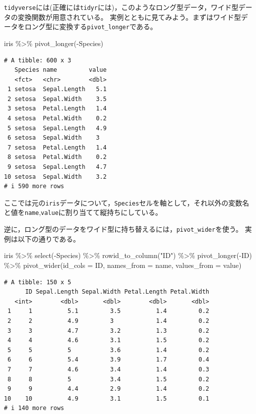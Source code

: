 \documentclass[
  a4paper,
]{ltjsbook}
\newenvironment{Shaded}{\begin{snugshade}}{\end{snugshade}}
\newcommand{\AttributeTok}[1]{\textcolor[rgb]{0.40,0.45,0.13}{#1}}
\newcommand{\FunctionTok}[1]{\textcolor[rgb]{0.28,0.35,0.67}{#1}}
\newcommand{\NormalTok}[1]{\textcolor[rgb]{0.00,0.23,0.31}{#1}}
\newcommand{\SpecialCharTok}[1]{\textcolor[rgb]{0.37,0.37,0.37}{#1}}
\newcommand{\StringTok}[1]{\textcolor[rgb]{0.13,0.47,0.30}{#1}}
\begin{document}
\texttt{tidyverse}には(正確には\texttt{tidyr}には)，このようなロング型データ，ワイド型データの変換関数が用意されている。
実例とともに見てみよう。まずはワイド型データをロング型に変換する\texttt{pivot\_longer}である。

\begin{Shaded}
\begin{Highlighting}[]
\NormalTok{iris }\SpecialCharTok{\%\textgreater{}\%} \FunctionTok{pivot\_longer}\NormalTok{(}\SpecialCharTok{{-}}\NormalTok{Species)}
\end{Highlighting}
\end{Shaded}

\begin{verbatim}
# A tibble: 600 x 3
   Species name         value
   <fct>   <chr>        <dbl>
 1 setosa  Sepal.Length   5.1
 2 setosa  Sepal.Width    3.5
 3 setosa  Petal.Length   1.4
 4 setosa  Petal.Width    0.2
 5 setosa  Sepal.Length   4.9
 6 setosa  Sepal.Width    3  
 7 setosa  Petal.Length   1.4
 8 setosa  Petal.Width    0.2
 9 setosa  Sepal.Length   4.7
10 setosa  Sepal.Width    3.2
# i 590 more rows
\end{verbatim}

ここでは元の\texttt{iris}データについて，\texttt{Species}セルを軸として，それ以外の変数名と値を\texttt{name},\texttt{value}に割り当てて縦持ちにしている。

逆に，ロング型のデータをワイド型に持ち替えるには，\texttt{pivot\_wider}を使う。
実例は以下の通りである。

\begin{Shaded}
\begin{Highlighting}[]
\NormalTok{iris }\SpecialCharTok{\%\textgreater{}\%}
  \FunctionTok{select}\NormalTok{(}\SpecialCharTok{{-}}\NormalTok{Species) }\SpecialCharTok{\%\textgreater{}\%}
  \FunctionTok{rowid\_to\_column}\NormalTok{(}\StringTok{"ID"}\NormalTok{) }\SpecialCharTok{\%\textgreater{}\%}
  \FunctionTok{pivot\_longer}\NormalTok{(}\SpecialCharTok{{-}}\NormalTok{ID) }\SpecialCharTok{\%\textgreater{}\%}
  \FunctionTok{pivot\_wider}\NormalTok{(}\AttributeTok{id\_cols =}\NormalTok{ ID, }\AttributeTok{names\_from =}\NormalTok{ name, }\AttributeTok{values\_from =}\NormalTok{ value)}
\end{Highlighting}
\end{Shaded}

\begin{verbatim}
# A tibble: 150 x 5
      ID Sepal.Length Sepal.Width Petal.Length Petal.Width
   <int>        <dbl>       <dbl>        <dbl>       <dbl>
 1     1          5.1         3.5          1.4         0.2
 2     2          4.9         3            1.4         0.2
 3     3          4.7         3.2          1.3         0.2
 4     4          4.6         3.1          1.5         0.2
 5     5          5           3.6          1.4         0.2
 6     6          5.4         3.9          1.7         0.4
 7     7          4.6         3.4          1.4         0.3
 8     8          5           3.4          1.5         0.2
 9     9          4.4         2.9          1.4         0.2
10    10          4.9         3.1          1.5         0.1
# i 140 more rows
\end{verbatim}
\end{document}
